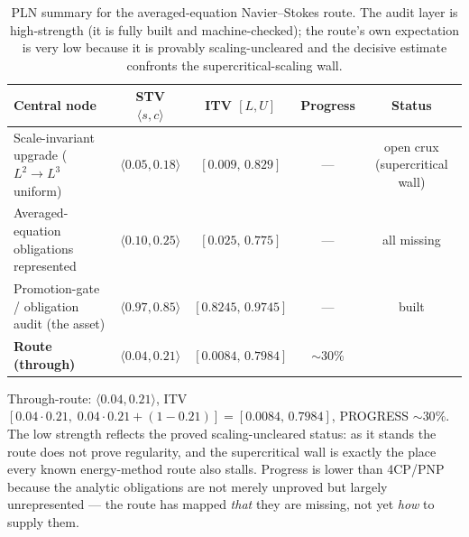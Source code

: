 \begin{table}[h]
\centering
\small
\begin{tabular}{lcccc}
\toprule
Central node & STV $\langle s,c\rangle$ & ITV $[L,U]$ & Progress & Status \\
\midrule
Scale-invariant upgrade ($L^2\!\to\!L^3$ uniform) & $\langle 0.05, 0.18\rangle$ & $[0.009,\,0.829]$ & --- & open crux (supercritical wall) \\
Averaged-equation obligations represented & $\langle 0.10, 0.25\rangle$ & $[0.025,\,0.775]$ & --- & all missing \\
Promotion-gate / obligation audit (the asset) & $\langle 0.97, 0.85\rangle$ & $[0.8245,\,0.9745]$ & --- & built \\
\midrule
\textbf{Route (through)} & $\langle 0.04, 0.21\rangle$ & $[0.0084,\,0.7984]$ & $\sim$30\% & \\
\bottomrule
\end{tabular}
\caption{PLN summary for the averaged-equation Navier--Stokes route. The audit
layer is high-strength (it is fully built and machine-checked); the route's own
expectation is very low because it is provably scaling-uncleared and the decisive
estimate confronts the supercritical-scaling wall.}
\end{table}

\noindent Through-route: $\langle 0.04, 0.21\rangle$, ITV
$[0.04\cdot 0.21,\;0.04\cdot 0.21+(1-0.21)] = [0.0084,\,0.7984]$,
PROGRESS $\sim 30\%$. The low strength reflects the proved scaling-uncleared
status: as it stands the route does not prove regularity, and the supercritical
wall is exactly the place every known energy-method route also stalls. Progress
is lower than 4CP/PNP because the analytic obligations are not merely unproved
but largely unrepresented --- the route has mapped \emph{that} they are missing,
not yet \emph{how} to supply them.
